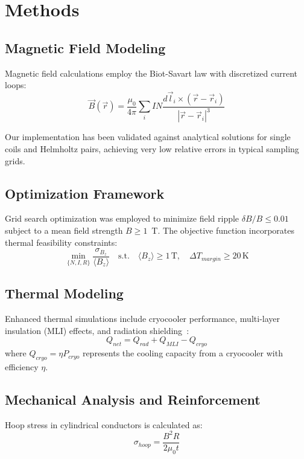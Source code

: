 \documentclass[journal]{IEEEtran}
\begin{document}
\section{Methods}

\subsection{Magnetic Field Modeling}
Magnetic field calculations employ the Biot-Savart law with discretized current loops:
\begin{equation}
\vec{B}(\vec{r}) = \frac{\mu_0}{4\pi} \sum_{i} I N \frac{d\vec{l}_i \times (\vec{r} - \vec{r}_i)}{|\vec{r} - \vec{r}_i|^3}
\end{equation}

Our implementation has been validated against analytical solutions for single coils and Helmholtz pairs, achieving very low relative errors in typical sampling grids.

\subsection{Optimization Framework}
Grid search optimization was employed to minimize field ripple $\delta B / B \leq 0.01$ subject to a mean field strength $B \geq 1$~T. The objective function incorporates thermal feasibility constraints:
\begin{equation}
\min_{\{N,I,R\}} \frac{\sigma_{B_z}}{\langle B_z \rangle} \quad \text{s.t.} \quad \langle B_z \rangle \geq 1\,\mathrm{T}, \quad \Delta T_{margin} \geq 20\,\mathrm{K}
\end{equation}

\subsection{Thermal Modeling}
Enhanced thermal simulations include cryocooler performance, multi-layer insulation (MLI) effects, and radiation shielding~\cite{iwasa2022}:
\begin{equation}
Q_{net} = Q_{rad} + Q_{MLI} - Q_{cryo}
\end{equation}
where $Q_{cryo} = \eta P_{cryo}$ represents the cooling capacity from a cryocooler with efficiency $\eta$.

\subsection{Mechanical Analysis and Reinforcement}
Hoop stress in cylindrical conductors is calculated as:
\begin{equation}
\sigma_{hoop} = \frac{B^2 R}{2 \mu_0 t}
\end{equation}
\end{document}
